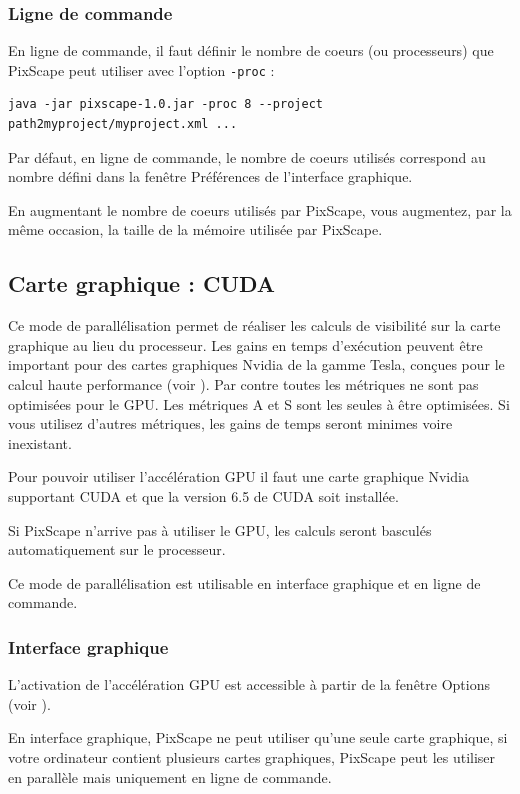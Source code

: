 \documentclass{report}
\begin{document}
\subsubsection{Ligne de commande}
En ligne de commande, il faut définir le nombre de coeurs (ou processeurs) que PixScape peut utiliser avec l'option \verb|-proc| :
\begin{Verbatim}
java -jar pixscape-1.0.jar -proc 8 --project path2myproject/myproject.xml ...
\end{Verbatim}
Par défaut, en ligne de commande, le nombre de coeurs utilisés correspond au nombre défini dans la fenêtre Préférences de l'interface graphique.

En augmentant le nombre de coeurs utilisés par PixScape, vous augmentez, par la même occasion, la taille de la mémoire utilisée par PixScape.

\subsection{Carte graphique : CUDA}
\label{cuda}
Ce mode de parallélisation permet de réaliser les calculs de visibilité sur la carte graphique au lieu du processeur. Les gains en temps d'exécution peuvent être important pour des cartes graphiques Nvidia de la gamme Tesla, conçues pour le calcul haute performance (voir ). Par contre toutes les métriques ne sont pas optimisées pour le GPU. Les métriques A et S sont les seules à être optimisées. Si vous utilisez d'autres métriques, les gains de temps seront minimes voire inexistant.

Pour pouvoir utiliser l'accélération GPU il faut une carte graphique Nvidia supportant CUDA et que la version 6.5 de CUDA soit installée. 

Si PixScape n'arrive pas à utiliser le GPU, les calculs seront basculés automatiquement sur le processeur.

Ce mode de parallélisation est utilisable en interface graphique et en ligne de commande.

\subsubsection{Interface graphique}

L'activation de l'accélération GPU est accessible à partir de la fenêtre Options (voir ).

En interface graphique, PixScape ne peut utiliser qu'une seule carte graphique, si votre ordinateur contient plusieurs cartes graphiques, PixScape peut les utiliser en parallèle mais uniquement en ligne de commande.
\end{document}
